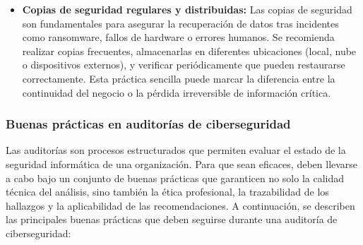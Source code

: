 \documentclass[a4paper, 11pt]{article}
\begin{document}
\begin{itemize}
    \item \textbf{Copias de seguridad regulares y distribuidas:}  
    Las copias de seguridad son fundamentales para asegurar la recuperación de datos tras incidentes como ransomware, fallos de hardware o errores humanos. Se recomienda realizar copias frecuentes, almacenarlas en diferentes ubicaciones (local, nube o dispositivos externos), y verificar periódicamente que pueden restaurarse correctamente. Esta práctica sencilla puede marcar la diferencia entre la continuidad del negocio o la pérdida irreversible de información crítica.

\end{itemize}
\par\vspace{0.5cm}

\subsubsection{Buenas prácticas en auditorías de ciberseguridad}
\par\vspace{0.5cm}

Las auditorías son procesos estructurados que permiten evaluar el estado de la seguridad informática de una organización. 
Para que sean eficaces, deben llevarse a cabo bajo un conjunto de buenas prácticas que garanticen no solo la calidad técnica del análisis, sino también la ética profesional, 
la trazabilidad de los hallazgos y la aplicabilidad de las recomendaciones. A continuación, se describen las principales buenas prácticas que deben seguirse durante una auditoría de ciberseguridad:
\end{document}
